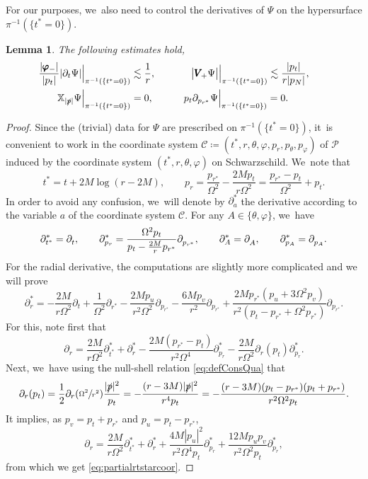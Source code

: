 \documentclass[10pt]{amsart}
\theoremstyle{plain}
\newtheorem{lemma}[proposition]{Lemma}
\theoremstyle{definition}
\newcommand\T{{\mathbb{X}}}
\begin{document}
For our purposes, we~also need to control the derivatives of $\Psi$ on the hypersurface $\pi^{-1}(\{t^* =0 \})$.

\begin{lemma}\label{LemderivPsiini}
The following estimates hold,
\begin{alignat*}{2}
\frac{|\pmb{\varphi}_-|}{|p_t|}| \partial_t \Psi | \Big\vert_{\pi^{-1} (\{t^* = 0 \})} &\lesssim \frac{1}{r},\qquad && \; \; \, \big| \pmb{V}_{\! +} \Psi \big| \Big\vert_{\pi^{-1} (\{t^* = 0 \})} \lesssim \frac{|p_t|}{r|p_N|}, \qquad \\
\T_{|\slashed{p}|} \Psi \Big\vert_{\pi^{-1} (\{t^* = 0 \})}&= 0, && p_t\partial_{p_{r^*}}\Psi \Big\vert_{\pi^{-1} (\{t^* = 0 \})}=0.
\end{alignat*}
\end{lemma}
\begin{proof}
Since the (trivial) data for $\Psi$ are prescribed on $\pi^{-1}(\{t^*=0 \})$, it~is convenient to work in the coordinate system $\mathscr{C} \coloneqq (t^*,r,\theta, \varphi,p_r,p_\theta,p_\varphi)$ of $\mathcal{P}$ induced by the coordinate system $(t^*,r,\theta,\varphi)$ on Schwarzschild. We~note that
\[
t^* = t+2M\log (r-2M),\qquad p_r=\frac{p_{r^*}}{\Omega^2}-\frac{2M p_t}{r \Omega^2}= \frac{p_{r^*}-p_t}{\Omega^2} +p_t.
\]
In order to avoid any confusion, we~will denote by $\partial^*_a$ the derivative according to the variable $a$ of the coordinate system $\mathscr{C}$. For any $A \in \{ \theta, \varphi \}$, we~have
\[
\partial^*_{t^*} = \partial_{t}^{\mathstrut}, \qquad \partial^*_{p_r} =\frac{\Omega^2 p_t}{p_t-\frac{2M}{r}p_{r^*}} \partial_{p_{r^*}}^{\mathstrut}, \qquad \partial^*_A=\partial_A^{\mathstrut}, \qquad \partial^*_{p_A}=\partial_{p_A}^{\mathstrut}.
\]
For the radial derivative, the computations are slightly more complicated and we will prove
\begin{equation}\label{eq:partialrtstarcoor}
\partial^*_{r}=-\frac{2M}{r\Omega^2} \partial_t+ \frac{1}{\Omega^2} \partial_{r^*} -\frac{2Mp_u}{r^2\Omega^2}\partial_{p_{r^*}}-\frac{6M p_v}{r^2}\partial_{p_{r^*}}+\frac{2M p_{r^*}(p_u+3 \Omega^2 p_v)}{r^2(p_t-p_{r^*}+\Omega^2 p_{r^*})} \partial_{p_{r^*}}.
\end{equation}
For this, note first that
\[
\partial_r = \frac{2M}{r \Omega^2} \partial^*_{t^*}+\partial^*_r-\frac{2M(p_{r^*}-p_t)}{r^2\Omega^4}\partial^*_{p_r}-\frac{2M}{r\Omega^2} \partial_r (p_t)\partial^*_{p_r}.
\]
Next, we~have using the null-shell relation \eqref{eq:defConsQua} that
\[
\partial_r (p_t) = \frac{1}{2}\partial_r(\sfrac{\Omega^2}{r^2}) \frac{|\slashed{p}|^2}{p_t} = - \frac{(r-3M)|\slashed{p}|^2}{r^4 p_t} = - \frac{(r-3M)(p_t-p_{r^*})(p_t+p_{r^*})}{r^2 \Omega^2 p_t}.
\]
It implies, as $p_v=p_t+p_{r^*}$ and $p_u=p_t-p_{r^*}$,
\[
\partial_r = \frac{2M}{r \Omega^2} \partial^*_{t^*}+\partial^*_r+\frac{4M|p_u|^2}{r^2\Omega^4p_t}\partial^*_{p_r}+\frac{12M p_up_v}{r^2\Omega^2p_t} \partial^*_{p_r},
\]
from which we get \eqref{eq:partialrtstarcoor}.


\end{proof}
\end{document}
